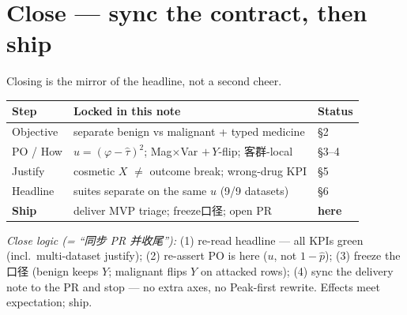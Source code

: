 \documentclass[11pt]{article}
\begin{document}
\section*{Close --- sync the contract, then ship}
Closing is the mirror of the headline, not a second cheer.

\begin{center}
\small
\begin{tabular}{@{}lll@{}}
\toprule
Step & Locked in this note & Status \\
\midrule
Objective & separate benign vs malignant + typed medicine & §2 \\
PO / How & $u=(\varphi-\hat\tau)^2$; Mag$\times$Var $+\,Y$-flip; 客群-local & §3--4 \\
Justify & cosmetic $X$ $\neq$ outcome break; wrong-drug KPI & §5 \\
Headline & suites separate on the same $u$ (9/9 datasets) & §6 \\
\textbf{Ship} & deliver MVP triage; freeze口径; open PR & \textbf{here} \\
\bottomrule
\end{tabular}
\end{center}

\noindent\textit{Close logic (= ``同步 PR 并收尾''):}
(1) re-read headline --- all KPIs green (incl.\ multi-dataset justify);
(2) re-assert PO is here ($u$, not $1-\hat p$);
(3) freeze the口径 (benign keeps $Y$; malignant flips $Y$ on attacked rows);
(4) sync the delivery note to the PR and stop --- no extra axes,
no Peak-first rewrite.
Effects meet expectation; ship.
\end{document}
